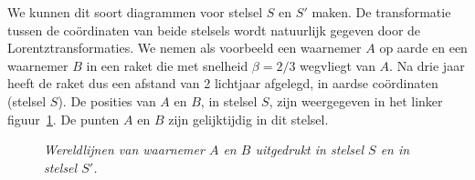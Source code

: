 We kunnen dit soort diagrammen voor stelsel $S$ en $S'$ maken. De
transformatie tussen de co\"ordinaten van beide stelsels wordt
natuurlijk gegeven door de Lorentztransformaties. We nemen als
voorbeeld een waarnemer $A$ op aarde en een waarnemer $B$ in een raket
die met snelheid $\beta=2/3$ wegvliegt van $A$. Na drie jaar heeft de
raket dus een afstand van 2 lichtjaar afgelegd, in aardse co\"ordinaten
(stelsel $S$). De posities van $A$ en $B$, in stelsel $S$, zijn
weergegeven in het linker figuur~\ref{f:grid1}. De punten $A$ en $B$
zijn gelijktijdig in dit stelsel.


\begin{figure}[ht] 
\centering
{}
\caption{{\sl \label{f:grid1} Wereldlijnen van waarnemer $A$ en $B$ uitgedrukt in stelsel $S$ en in stelsel $S'$.}}
\end{figure}

